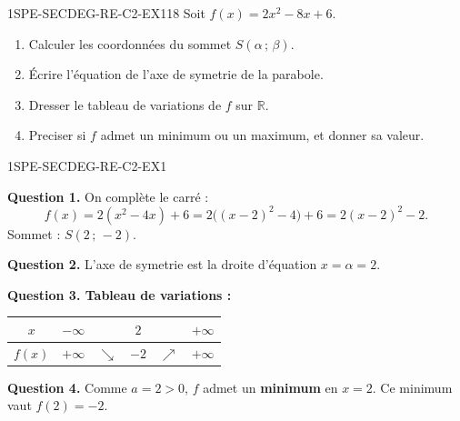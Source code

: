 


\begin{exercice}{1SPE-SECDEG-RE-C2-EX1}{1}{8}
Soit $f(x) = 2x^2 - 8x + 6$.
\begin{enumerate}
  \item Calculer les coordonnées du sommet $S(\alpha\,;\,\beta)$.
  \item Écrire l'équation de l'axe de symetrie de la parabole.
  \item Dresser le tableau de variations de $f$ sur $\mathbb{R}$.
  \item Preciser si $f$ admet un minimum ou un maximum, et donner sa valeur.
\end{enumerate}
\end{exercice}


\begin{corrige}{1SPE-SECDEG-RE-C2-EX1}


\textbf{Question 1.} On complète le carré :
\[
f(x)=2(x^2-4x)+6=2\bigl((x-2)^2-4\bigr)+6=2(x-2)^2-2.
\]
Sommet : $S(2\,;\,-2)$.

\textbf{Question 2.} L'axe de symetrie est la droite d'équation $x = \alpha = 2$.

\textbf{Question 3. Tableau de variations :}

\begin{center}
\begin{tabular}{|c|ccccc|}
\hline
$x$ & $-\infty$ & & $2$ & & $+\infty$ \\
\hline
$f(x)$ & $+\infty$ & $\searrow$ & $-2$ & $\nearrow$ & $+\infty$ \\
\hline
\end{tabular}
\end{center}

\textbf{Question 4.} Comme $a = 2 > 0$, $f$ admet un \textbf{minimum} en $x = 2$. Ce minimum vaut $f(2) = -2$.

\end{corrige}


